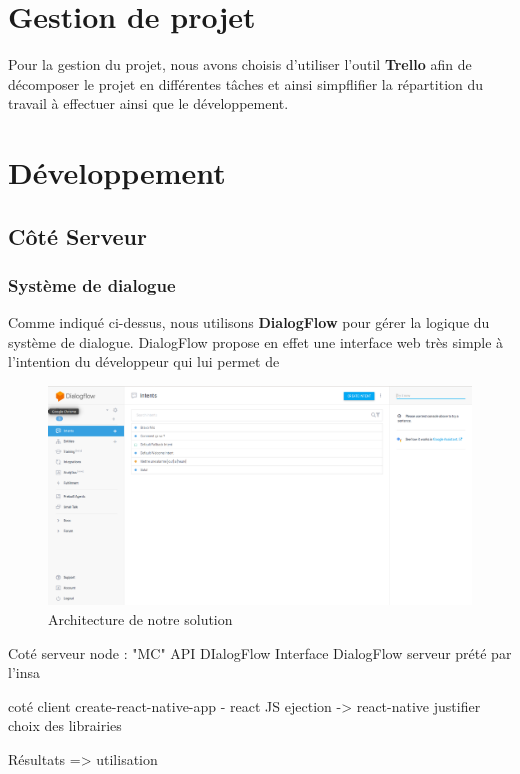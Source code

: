 \section{Gestion de projet}

Pour la gestion du projet, nous avons choisis d'utiliser l'outil \textbf{Trello}\cite{trello} afin de décomposer le projet en différentes tâches et ainsi simpflifier 
la répartition du travail à effectuer ainsi que le développement. 

\section{Développement}

\subsection{Côté Serveur}

\subsubsection{Système de dialogue}

Comme indiqué ci-dessus, nous utilisons \textbf{DialogFlow} pour gérer la logique du système de dialogue. DialogFlow propose en effet une interface web très simple à 
l'intention du développeur qui lui permet de  

\begin{figure}[!h]
    \centering
        \centering
        \includegraphics[width=1\textwidth]{images/dialogflow.png}
        \caption{Architecture de notre solution}
\end{figure}

Coté serveur 
    node : "MC"
    API DIalogFlow
    Interface DialogFlow 
    serveur prété par l'insa 

coté client 
    create-react-native-app - react JS 
    ejection -> react-native 
    justifier choix des librairies 

Résultats => utilisation 
    